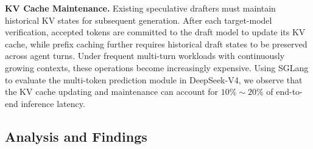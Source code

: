\textbf{KV Cache Maintenance.} Existing speculative drafters must maintain historical KV states for subsequent generation. After each target-model verification, accepted tokens are committed to the draft model to update its KV cache, while prefix caching further requires historical draft states to be preserved across agent turns. Under frequent multi-turn workloads with continuously growing contexts, these operations become increasingly expensive. Using SGLang to evaluate the multi-token prediction module in DeepSeek-V4, we observe that the KV cache  updating and maintenance can account for \(10\%\sim20\%\) of end-to-end inference latency.



\subsection{Analysis and Findings}



